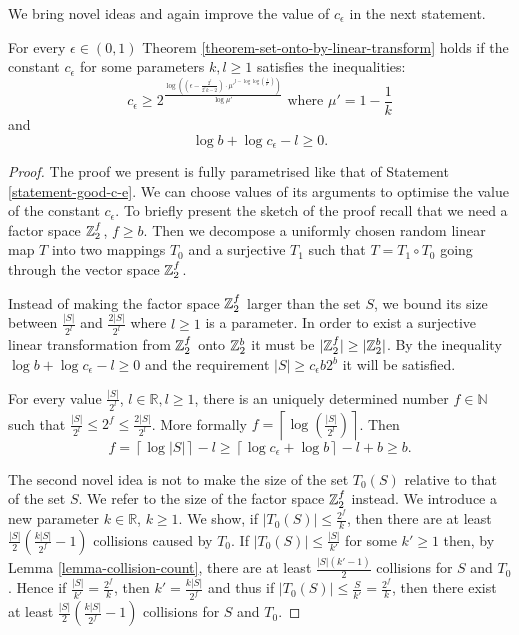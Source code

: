 We bring novel ideas and again improve the value of $c_\epsilon$ in the next statement.
\begin{statement}
\label{statement-better-c-e}
For every $\epsilon \in (0,1)$ Theorem \ref{theorem-set-onto-by-linear-transform} holds if the constant $c_{\epsilon}$ for some parameters $k, l \geq 1$ satisfies the inequalities:
\begin{equation}
\label{inequality-better-c-e}
c_\epsilon \geq 2 ^ {\frac{\log \left(\left({\epsilon - \frac{2^l}{2^l k - 2}}\right)\cdot{{\mu'} ^ {l - \log \log \left( \frac{1}{\mu'} \right)}}\right)}{\log {\mu'}}} \text{ where $\mu' = 1 - \frac{1}{k}$}
\end{equation}
and 
\[
	\log b + \log c_{\epsilon} - l \geq 0 \text{.}
\]
\end{statement}
\begin{proof}
The proof we present is fully parametrised like that of Statement \ref{statement-good-c-e}. We can choose values of its arguments to optimise the value of the constant $c_\epsilon$. To briefly present the sketch of the proof recall that we need a factor space $\mathbb{Z}_{2}^{f}$, $f \geq b$. Then we decompose a uniformly chosen random linear map $T$ into two mappings $T_0$ and a surjective $T_1$ such that $T = T_1 \circ T_0$ going through the vector space $\mathbb{Z}_{2}^{f}$.

Instead of making the factor space $\mathbb{Z}_{2}^{f}$ larger than the set $S$, we bound its size between $\frac{|S|}{2 ^ l}$ and $\frac{2|S|}{2 ^ l}$ where $l \geq 1$ is a parameter. In order to exist a surjective linear transformation from $\mathbb{Z}_{2}^{f}$ onto $\mathbb{Z}_{2}^{b}$ it must be $|\mathbb{Z}_{2}^{f}| \geq |\mathbb{Z}_{2}^{b}|$. By the inequality $\log b + \log c_{\epsilon} - l \geq 0$ and the requirement $|S| \geq c_\epsilon b 2 ^ b$ it will be satisfied.

For every value $\frac{|S|}{2^l}$, $l \in \mathbb{R}, l \geq 1$, there is an uniquely determined number $f \in \mathbb{N}$ such that $\frac{|S|}{2 ^ l} \leq 2 ^ f \leq \frac{2|S|}{2 ^ l}$. More formally $f = \left\lceil \log \left( \frac{|S|}{2 ^ l} \right) \right\rceil$. Then \[ f = \left\lceil \log|S| \right\rceil - l \geq \left\lceil \log c_{\epsilon} + \log b \right\rceil - l + b \geq b \text{.} \]

The second novel idea is not to make the size of the set $T_0(S)$ relative to that of the set $S$. We refer to the size of the factor space $\mathbb{Z}_{2}^{f}$ instead. We introduce a new parameter $k \in \mathbb{R}$, $k \geq 1$. We show, if $|T_0(S)| \leq \frac{2 ^ f}{k}$, then there are at least $\frac{|S|}{2}\left(\frac{k|S|}{2 ^ f} - 1\right)$ collisions caused by $T_0$. If $|T_0(S)| \leq \frac{|S|}{k'}$ for some $k' \geq 1$ then, by Lemma \ref{lemma-collision-count}, there are at least $\frac{|S|(k' - 1)}{2}$ collisions for $S$ and $T_0$. Hence if $\frac{|S|}{k'} = \frac{2 ^ f}{k}$,  then $k' = \frac{k|S|}{2 ^ f}$ and thus if $|T_0(S)| \leq \frac{S}{k'} = \frac{2 ^ f}{k}$, then there exist at least $\frac{|S|}{2}(\frac{k|S|}{2 ^ f} - 1)$ collisions for $S$ and $T_0$.


\end{proof}
